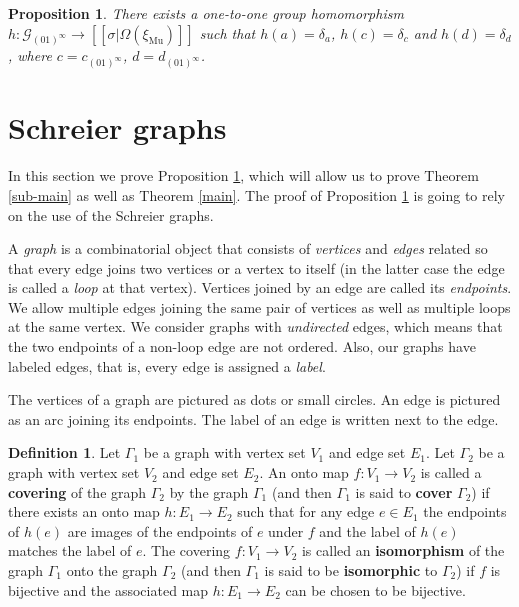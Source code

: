 \documentclass[12pt]{article}
\newtheorem{proposition}[theorem]{Proposition}
\theoremstyle{definition}
\newtheorem{definition}[theorem]{Definition}
\def\cG{\mathcal{G}}
\def\de{\delta}
\def\si{\sigma}
\def\xiGE{\xi_{\mathrm{Mu}}}
\begin{document}
\begin{proposition}\label{inj-homomorph}
There exists a one-to-one group homomorphism 
$h:\cG_{(01)^\infty}\to[[\si|\Omega(\xiGE)]]$ such that $h(a)=\de_a$, 
$h(c)=\de_c$ and $h(d)=\de_d$, where $c=c_{(01)^\infty}$, 
$d=d_{(01)^\infty}$.
\end{proposition}

%
\section{Schreier graphs}\label{sect-Schr}

In this section we prove Proposition \ref{inj-homomorph}, which will allow 
us to prove Theorem \ref{sub-main} as well as Theorem \ref{main}.  The 
proof of Proposition \ref{inj-homomorph} is going to rely on the use of the 
Schreier graphs.

A \emph{graph} is a combinatorial object that consists of \emph{vertices} 
and \emph{edges} related so that every edge joins two vertices or a vertex 
to itself (in the latter case the edge is called a \emph{loop} at that 
vertex).  Vertices joined by an edge are called its \emph{endpoints}.  We 
allow multiple edges joining the same pair of vertices as well as multiple 
loops at the same vertex.  We consider graphs with \emph{undirected} edges, 
which means that the two endpoints of a non-loop edge are not ordered.  
Also, our graphs have labeled edges, that is, every edge is assigned a 
\emph{label}.

The vertices of a graph are pictured as dots or small circles.  An edge is 
pictured as an arc joining its endpoints.  The label of an edge is written 
next to the edge.

\begin{definition}\label{def-covering}
Let $\Gamma_1$ be a graph with vertex set $V_1$ and edge set $E_1$.  Let 
$\Gamma_2$ be a graph with vertex set $V_2$ and edge set $E_2$.  An onto 
map $f:V_1\to V_2$ is called a \textbf{covering} of the graph $\Gamma_2$ by 
the graph $\Gamma_1$ (and then $\Gamma_1$ is said to \textbf{cover} 
$\Gamma_2$) if there exists an onto map $h:E_1\to E_2$ such that for any 
edge $e\in E_1$ the endpoints of $h(e)$ are images of the endpoints of $e$ 
under $f$ and the label of $h(e)$ matches the label of $e$.  The covering 
$f:V_1\to V_2$ is called an \textbf{isomorphism} of the graph $\Gamma_1$ 
onto the graph $\Gamma_2$ (and then $\Gamma_1$ is said to be 
\textbf{isomorphic} to $\Gamma_2$) if $f$ is bijective and the associated 
map $h:E_1\to E_2$ can be chosen to be bijective.
\end{definition}
\end{document}
